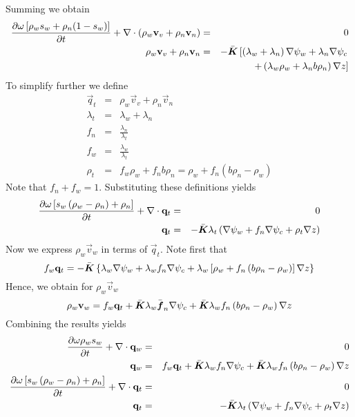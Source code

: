 \documentclass[10pt,dvips,twoside,reqno]{amsart}
\begin{document}
Summing  we obtain
\begin{eqnarray}
  \label{eq:totalmb}
  \frac{\partial {\omega \left[\rho_w s_w + \rho_n (1-s_w)\right]}}{\partial {t}} + \nabla \cdot \left( \rho_w {\bf v}_v + \rho_n {\bf v}_n \right) &=& 0 \\
\rho_w {\bf v}_v + \rho_n {\bf v}_n &=& -\bar{\mbox{{\boldmath ${K}$}}} \left[ \left( \lambda_w + \lambda_n \right) \nabla \psi_w + \lambda_n \nabla \psi_c \right. \\
&& \left. + \left( \lambda_w \rho_w  + \lambda_n b \rho_n \right) \nabla z \right]  
\end{eqnarray}
To simplify further we define
\begin{eqnarray}
  \vec q_t &=& \rho_w \vec v_v + \rho_n \vec v_n \\
  \lambda_t &=&  \lambda_w + \lambda_n \\
  f_n &=& \frac{\lambda_n}{\lambda_t}\\
  f_w &=& \frac{\lambda_w}{\lambda_t} \\
  \rho_t &=& f_w\rho_w  + f_n b \rho_n = \rho_w + f_n (b \rho_n - \rho_w)
\end{eqnarray}
Note that $f_n + f_w = 1$. Substituting these definitions yields
\begin{eqnarray}
  \label{eq:totalHet}
  \frac{\partial {\omega \left[s_w \left(\rho_w - \rho_n \right)+ \rho_n \right]}}{\partial {t}} + \nabla \cdot {\bf q}_t &=& 0 \\
{\bf q}_t &=& - \bar{\mbox{{\boldmath ${K}$}}} \lambda_t \left( \nabla \psi_w + f_n \nabla \psi_c + \rho_t \nabla z \right)
\end{eqnarray}
Now we express $\rho_w \vec v_w$ in terms of $\vec q_t$. Note first that 
\begin{equation}
  \label{eq:fracflow}
  f_w {\bf q}_t = -\bar{\mbox{{\boldmath ${K}$}}} \left\{ \lambda_w \nabla \psi_w + \lambda_w f_n \nabla \psi_c + \lambda_w \left[ \rho_w + f_n \left( b \rho_n - \rho_w \right) \right]  \nabla z \right\}
\end{equation}
Hence, we obtain for $\rho_w \vec v_w$
\begin{equation}
\rho_w {\bf v}_w = f_w {\bf q}_t + \bar{\mbox{{\boldmath ${K}$}}} \lambda_w \bar{\mbox{{\boldmath ${f}$}}}_n \nabla \psi_c + \bar{\mbox{{\boldmath ${K}$}}} \lambda_w f_n \left(  b \rho_n -\rho_w\right) \nabla z 
\end{equation}
Combining the results yields
\begin{eqnarray}
\frac{\partial {\omega \rho_w s_w}}{\partial {t}} + \nabla \cdot {\bf q}_w &=& 0 \\
{\bf q}_w &=&  f_w {\bf q}_t + \bar{\mbox{{\boldmath ${K}$}}} \lambda_w f_n \nabla \psi_c + \bar{\mbox{{\boldmath ${K}$}}} \lambda_w f_n \left(  b \rho_n -\rho_w \right) \nabla z \\
\frac{\partial {\omega \left[s_w \left(\rho_w - \rho_n \right)+ \rho_n \right]}}{\partial {t}}+ \nabla \cdot {\bf q}_t &=& 0 \\
{\bf q}_t  &=& - \bar{\mbox{{\boldmath ${K}$}}} \lambda_t \left( \nabla \psi_w + f_n \nabla \psi_c + \rho_t \nabla z \right) 
\end{eqnarray}
\end{document}
